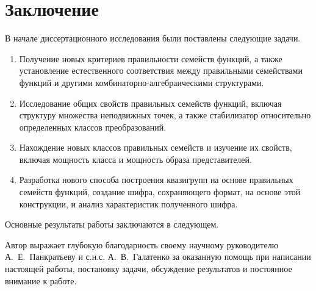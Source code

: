 \chapter*{Заключение}                       %


    В начале диссертационного исследования были поставлены следующие задачи.
    \begin{enumerate}
        \item Получение новых критериев правильности семейств функций, а также установление естественного соответствия между правильными семействами функций и другими комбинаторно-алгебраическими структурами.
        \item Исследование общих свойств правильных семейств функций, включая структуру множества неподвижных точек, а также стабилизатор относительно определенных классов преобразований.
        \item Нахождение новых классов правильных семейств и изучение их свойств, включая мощность класса и мощность образа представителей.
        \item Разработка нового способа построения квазигрупп на основе правильных семейств функций, создание шифра, сохраняющего формат, на основе этой конструкции, и анализ характеристик полученного шифра.
    \end{enumerate}
    Основные результаты работы заключаются в следующем.
    
    Автор выражает глубокую благодарность своему научному руководителю А.~Е.~Панкратьеву  и с.н.с. А.~В.~Галатенко за оказанную помощь при написании настоящей работы, постановку задачи, обсуждение результатов и постоянное внимание к работе.
